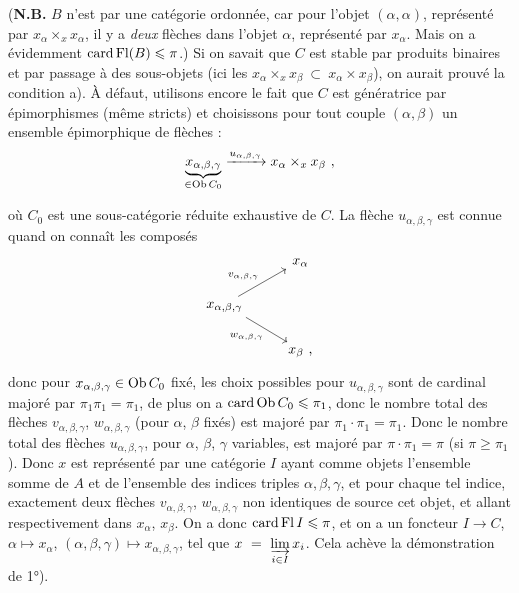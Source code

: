 (\textbf{N.B.} $B$ n'est par une catégorie ordonnée, car pour l'objet $(\alpha,\alpha)$, représenté par $x_{\alpha}\times_x x_{\alpha}$, %
il y a \textit{deux} flèches dans l'objet $\alpha$, représenté par $x_{\alpha}$. Mais on a évidemment $\operatorname{card} \operatorname{Fl}(B) \leqslant \pi$.) Si on savait que $C$ est stable par produits binaires et par passage à des sous-objets (ici les $x_{\alpha} \times_x x_{\beta} \ \subset \ x_{\alpha} \times x_{\beta}$), on aurait prouvé la condition a). À défaut, utilisons encore le fait que $C$ est génératrice par épimorphismes (même stricts) et choisissons pour tout couple $(\alpha,\beta)$ un ensemble épimorphique de flèches :
\[ \underbrace{x_{\alpha,\beta,\gamma}}_{\in \operatorname{Ob} C_0} \xrightarrow{u_{\alpha,\beta,\gamma}} x_{\alpha} \times_x x_{\beta} \ , \]

où $C_0$ est une sous-catégorie réduite exhaustive de $C$. La flèche $u_{\alpha,\beta,\gamma}$ est connue quand on connaît les composés
\[
\begin{tikzcd}
& x_{\alpha} \\
x_{\alpha,\beta,\gamma} \arrow[ur, "v_{\alpha,\beta,\gamma}"] \arrow[dr, "w_{\alpha,\beta,\gamma}"'] & \\
& x_{\beta} \text{ ,}
\end{tikzcd}
\]
donc pour $x_{\alpha,\beta,\gamma} \in \operatorname{Ob} C_0$ fixé, les choix possibles pour $u_{\alpha,\beta,\gamma}$ sont de cardinal majoré par $\pi_1\pi_1 = \pi_1$, de plus on a $\operatorname{card} \operatorname{Ob} C_0 \leqslant \pi_1$, donc le nombre total des flèches $v_{\alpha,\beta,\gamma}$, $w_{\alpha,\beta,\gamma}$ (pour $\alpha$, $\beta$ fixés) est majoré par $\pi_1 \cdot \pi_1 = \pi_1$. Donc le nombre total des flèches $u_{\alpha,\beta,\gamma}$, pour $\alpha$, $\beta$, $\gamma$ variables, est majoré par $\pi \cdot \pi_1 = \pi$ (si $\pi \geqslant \pi_1$). Donc $x$ est représenté par une catégorie $I$ ayant comme objets l'ensemble somme de $A$ et de l'ensemble des indices triples $\alpha,\beta,\gamma$, et pour chaque tel indice, exactement deux flèches $v_{\alpha,\beta,\gamma}$, $w_{\alpha,\beta,\gamma}$ non identiques de source cet objet, et allant respectivement dans $x_{\alpha}$, $x_{\beta}$. On a donc $\operatorname{card} \operatorname{Fl} I \leqslant \pi$, et on a un foncteur $I \longrightarrow C$, $\alpha \longmapsto x_{\alpha}$, $(\alpha,\beta,\gamma) \longmapsto x_{\alpha,\beta,\gamma}$, tel que $x \ = \ \varinjlim\limits_{i\in I} x_i$. Cela achève la démonstration de 1°).

